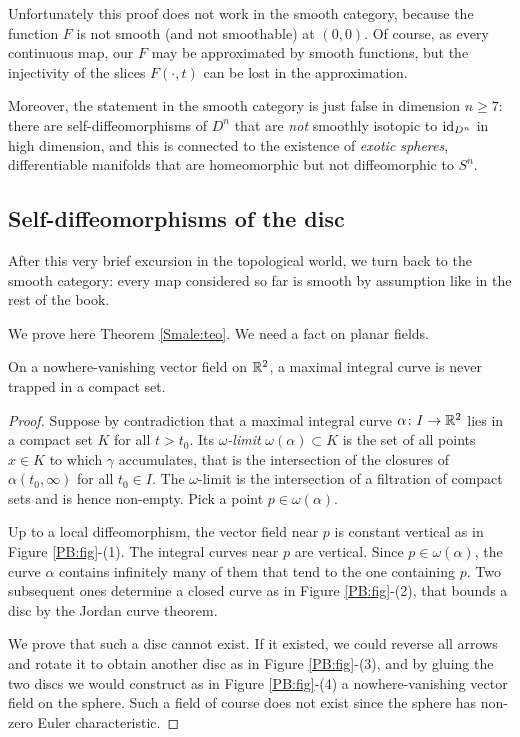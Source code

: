 Unfortunately this proof does not work in the smooth category, because the function $F$ is not smooth (and not smoothable) at $(0,0)$. Of course, as every continuous map, our $F$ may be approximated by smooth functions, but the injectivity of the slices $F(\cdot, t)$ can be lost in the approximation.  

Moreover, the statement in the smooth category is just false in dimension $n\geqslant 7$: there are self-diffeomorphisms of $D^n$ that are \emph{not} smoothly isotopic to ${\rm id}_{D^n}$ in high dimension, and this is connected to the existence of \emph{exotic spheres}, differentiable manifolds that are homeomorphic but not diffeomorphic to $S^n$. 

\subsection{Self-diffeomorphisms of the disc} \label{self:disc:subsection}
After this very brief excursion in the topological world, we turn back to the smooth category: every map considered so far is smooth by assumption like in the rest of the book. 

We prove here Theorem \ref{Smale:teo}. We need a fact on planar fields. 

\begin{prop} \label{PB:prop}
On a nowhere-vanishing vector field on $\mathbb{R}^2$, a maximal integral curve is never trapped in a compact set.
\end{prop}
\begin{proof}
Suppose by contradiction that a maximal integral curve $\alpha\colon I \to \mathbb{R}^2$ lies in a compact set $K$ for all $t>t_0$. Its \emph{$\omega$-limit} $\omega(\alpha)\subset K$ is the set of all points $x\in K$ to which $\gamma$ accumulates, that is the intersection of the closures of $\alpha(t_0,\infty)$ for all $t_0 \in I$. The $\omega$-limit is the intersection of a filtration of compact sets and is hence non-empty. Pick a point $p\in\omega(\alpha)$.

Up to a local diffeomorphism, the vector field near $p$ is constant vertical as in Figure \ref{PB:fig}-(1). The integral curves near $p$ are vertical. Since $p\in\omega(\alpha)$, the curve $\alpha$ contains infinitely many of them that tend to the one containing $p$. Two subsequent ones determine a closed curve as in Figure \ref{PB:fig}-(2), that bounds a disc by the Jordan curve theorem. 

We prove that such a disc cannot exist. If it existed, we could reverse all arrows and rotate it to obtain another disc as in Figure \ref{PB:fig}-(3), and by gluing the two discs we would construct as in Figure \ref{PB:fig}-(4) a nowhere-vanishing vector field on the sphere. Such a field of course does not exist since the sphere has non-zero Euler characteristic.
\end{proof}

